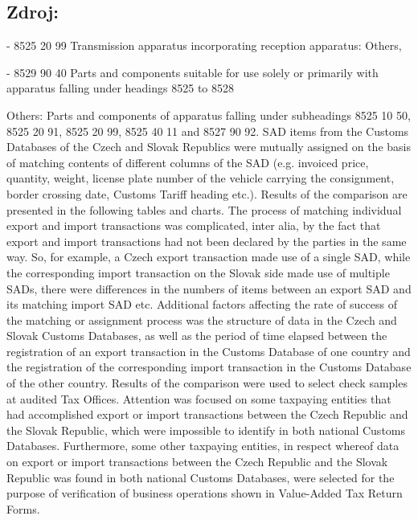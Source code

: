 \documentclass[10pt]{article}
\begin{document}
\subsection*{Zdroj:}



- 8525 20 99 Transmission apparatus incorporating reception apparatus: Others,



- 8529 90 40 Parts and components suitable for use solely or primarily with apparatus falling under headings 8525 to 8528

Others: Parts and components of apparatus falling under subheadings 8525 10 50, 8525 20 91, 8525 20 99, 8525 40 11 and 8527 90 92.
SAD items from the Customs Databases of the Czech and Slovak Republics were mutually assigned on the basis of matching contents of different columns of the SAD (e.g. invoiced price, quantity, weight, license plate number of the vehicle carrying the consignment, border crossing date, Customs Tariff heading etc.).
Results of the comparison are presented in the following tables and charts.
The process of matching individual export and import transactions was complicated, inter alia, by the fact that export and import transactions had not been declared by the parties in the same way.
So, for example, a Czech export transaction made use of a single SAD, while the corresponding import transaction on the Slovak side made use of multiple SADs, there were differences in the numbers of items between an export SAD and its matching import SAD etc.
Additional factors affecting the rate of success of the matching or assignment process was the structure of data in the Czech and Slovak Customs Databases, as well as the period of time elapsed between the registration of an export transaction in the Customs Database of one country and the registration of the corresponding import transaction in the Customs Database of the other country.
Results of the comparison were used to select check samples at audited Tax Offices.
Attention was focused on some taxpaying entities that had accomplished export or import transactions between the Czech Republic and the Slovak Republic, which were impossible to identify in both national Customs Databases.
Furthermore, some other taxpaying entities, in respect whereof data on export or import transactions between the Czech Republic and the Slovak Republic was found in both national Customs Databases, were selected for the purpose of verification of business operations shown in Value-Added Tax Return Forms.
\end{document}
